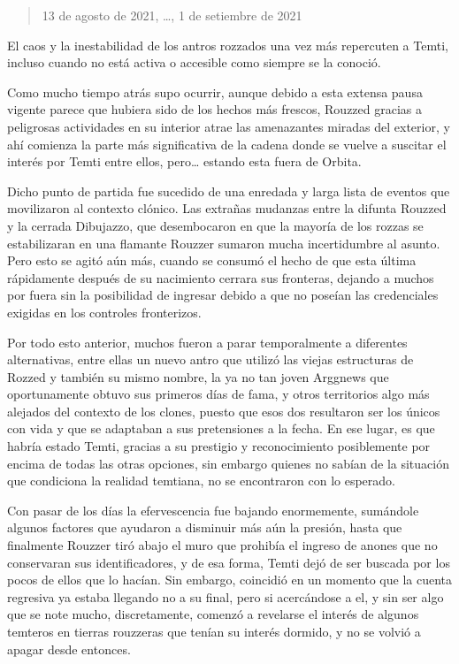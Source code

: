 \documentclass[
  spanish,
]{book}
\begin{document}
\begin{quote}
13 de agosto de 2021, \ldots, 1 de setiembre de 2021
\end{quote}

El caos y la inestabilidad de los antros rozzados una vez más repercuten a Temti, incluso cuando no está activa o accesible como siempre se la conoció.

Como mucho tiempo atrás supo ocurrir, aunque debido a esta extensa pausa vigente parece que hubiera sido de los hechos más frescos, Rouzzed gracias a peligrosas actividades en su interior atrae las amenazantes miradas del exterior, y ahí comienza la parte más significativa de la cadena donde se vuelve a suscitar el interés por Temti entre ellos, pero\ldots{} estando esta fuera de Orbita.

Dicho punto de partida fue sucedido de una enredada y larga lista de eventos que movilizaron al contexto clónico. Las extrañas mudanzas entre la difunta Rouzzed y la cerrada Dibujazzo, que desembocaron en que la mayoría de los rozzas se estabilizaran en una flamante Rouzzer sumaron mucha incertidumbre al asunto. Pero esto se agitó aún más, cuando se consumó el hecho de que esta última rápidamente después de su nacimiento cerrara sus fronteras, dejando a muchos por fuera sin la posibilidad de ingresar debido a que no poseían las credenciales exigidas en los controles fronterizos.

Por todo esto anterior, muchos fueron a parar temporalmente a diferentes alternativas, entre ellas un nuevo antro que utilizó las viejas estructuras de Rozzed y también su mismo nombre, la ya no tan joven Arggnews que oportunamente obtuvo sus primeros días de fama, y otros territorios algo más alejados del contexto de los clones, puesto que esos dos resultaron ser los únicos con vida y que se adaptaban a sus pretensiones a la fecha. En ese lugar, es que habría estado Temti, gracias a su prestigio y reconocimiento posiblemente por encima de todas las otras opciones, sin embargo quienes no sabían de la situación que condiciona la realidad temtiana, no se encontraron con lo esperado.

Con pasar de los días la efervescencia fue bajando enormemente, sumándole algunos factores que ayudaron a disminuir más aún la presión, hasta que finalmente Rouzzer tiró abajo el muro que prohibía el ingreso de anones que no conservaran sus identificadores, y de esa forma, Temti dejó de ser buscada por los pocos de ellos que lo hacían. Sin embargo, coincidió en un momento que la cuenta regresiva ya estaba llegando no a su final, pero si acercándose a el, y sin ser algo que se note mucho, discretamente, comenzó a revelarse el interés de algunos temteros en tierras rouzzeras que tenían su interés dormido, y no se volvió a apagar desde entonces.
\end{document}
